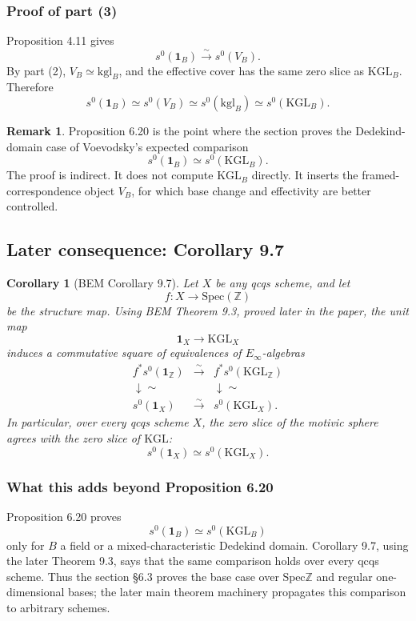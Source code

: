 \documentclass[11pt,a4paper]{article}
\newcommand{\Z}{\mathbb Z}
\newcommand{\Spec}{\mathrm{Spec}}
\newcommand{\KGL}{\mathrm{KGL}}
\newcommand{\kgl}{\mathrm{kgl}}
\newcommand{\1}{\mathbf 1}
\theoremstyle{bemstyle}
\newtheorem{corollary}[theorem]{Corollary}
\theoremstyle{definition}
\newtheorem{remark}[theorem]{Remark}
\begin{document}
\subsubsection{Proof of part (3)}

Proposition 4.11 gives
\[
       s^0(\1_B)\xrightarrow{\sim}s^0(V_B).
\]
By part (2), \(V_B\simeq\kgl_B\), and the effective cover has the same zero slice as \(\KGL_B\). Therefore
\[
       s^0(\1_B)\simeq s^0(V_B)\simeq s^0(\kgl_B)\simeq s^0(\KGL_B).
\]

\begin{remark}
Proposition 6.20 is the point where the section proves the Dedekind-domain case of Voevodsky's expected comparison
\[
       s^0(\1_B)\simeq s^0(\KGL_B).
\]
The proof is indirect. It does not compute \(\KGL_B\) directly. It inserts the framed-correspondence object \(V_B\), for which base change and effectivity are better controlled.
\end{remark}

\subsection{Later consequence: Corollary 9.7}

\begin{corollary}[BEM Corollary 9.7]
Let \(X\) be any qcqs scheme, and let
\[
        f:X\longrightarrow \Spec(\Z)
\]
be the structure map. Using BEM Theorem 9.3, proved later in the paper, the unit map
\[
        \1_X\longrightarrow \KGL_X
\]
induces a commutative square of equivalences of \(E_\infty\)-algebras
\[
\begin{array}{ccc}
        f^*s^0(\1_{\Z}) & \xrightarrow{\sim} & f^*s^0(\KGL_{\Z}) \\
        \downarrow\scriptstyle{\sim} && \downarrow\scriptstyle{\sim} \\
        s^0(\1_X) & \xrightarrow{\sim} & s^0(\KGL_X).
\end{array}
\]
In particular, over every qcqs scheme \(X\), the zero slice of the motivic sphere agrees with the zero slice of \(\KGL\):
\[
        s^0(\1_X)\simeq s^0(\KGL_X).
\]
\end{corollary}

\subsubsection{What this adds beyond Proposition 6.20}

Proposition 6.20 proves
\[
        s^0(\1_B)\simeq s^0(\KGL_B)
\]
only for \(B\) a field or a mixed-characteristic Dedekind domain. Corollary 9.7, using the later Theorem 9.3, says that the same comparison holds over every qcqs scheme. Thus the section \S6.3 proves the base case over \(\Spec\Z\) and regular one-dimensional bases; the later main theorem machinery propagates this comparison to arbitrary schemes.
\end{document}
